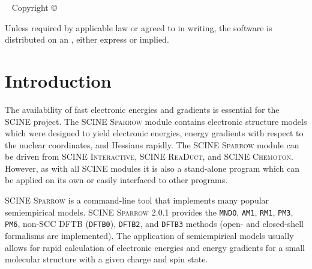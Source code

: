 \documentclass[]{tufte-book}
\title[SCINE Sparrow manual]{User Manual \vskip 0.5em {\setlength{\parindent}{0pt} \Huge SCINE Sparrow 2.0.1}}
\author[The SCINE Sparrow Developers]{The SCINE Sparrow Developers: \newline \noindent Francesco Bosia, Tamara Husch, Alain Vaucher, and Markus Reiher}
\newcommand{\monthyear}{%
  \ifcase\month\or January\or February\or March\or April\or May\or June\or
  July\or August\or September\or October\or November\or
  December\fi\space\number\year
}
\begin{document}
\setlength{\parindent}{0pt}

\frontmatter


\maketitle


\newpage
\begin{fullwidth}
~\vfill
\thispagestyle{empty}
\setlength{\parindent}{0pt}
\setlength{\parskip}{\baselineskip}
Copyright \copyright\ \the\year\ \thanklessauthor


\par{}

\par Unless required by applicable law or agreed to in writing, the software 
is distributed on an , either express or implied. 

\end{fullwidth}

\tableofcontents




\mainmatter

\let\cleardoublepage\clearpage
\chapter{Introduction}

The availability of fast electronic energies and gradients is essential for the SCINE project. The SCINE \textsc{Sparrow} 
module contains electronic structure models which were designed to yield electronic energies, energy gradients with 
respect to the nuclear coordinates, and Hessians rapidly. The SCINE \textsc{Sparrow} module can be driven from SCINE 
\textsc{Interactive}, SCINE \textsc{ReaDuct}, and SCINE \textsc{Chemoton}. However, as with all SCINE modules it is also 
a stand-alone program which can be applied on its own or easily interfaced to other programs.

SCINE \textsc{Sparrow} is a command-line tool that implements many popular semiempirical models. SCINE \textsc{Sparrow} 2.0.1 
provides the \texttt{MNDO}, \texttt{AM1}, \texttt{RM1}, \texttt{PM3}, \texttt{PM6}, non-SCC DFTB (\texttt{DFTB0}), \texttt{DFTB2}, and \texttt{DFTB3} methods 
(open- and closed-shell formalisms are implemented). 
The application of semiempirical models usually allows for rapid calculation of electronic energies and energy gradients 
for a small molecular structure with a given charge and spin state.
\end{document}
